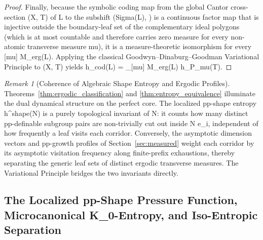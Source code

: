 \documentclass[11pt,a4paper,reqno]{amsart}
\def\({}%
\def\){}%
\def\mathcal#1{#1}%
\def\mathbb#1{#1}%
\def\mathrm#1{#1}%
\def\mu{mu}%
\def\Sigma{Sigma}%
\theoremstyle{definition}
\theoremstyle{remark}
\newtheorem{remark}[theorem]{Remark}
\begin{document}
\begin{proof}
Finally, because the symbolic coding map from the global Cantor cross-section \((X, T)\) of \(\mathcal{L}\) to the subshift \((\Sigma(\mathcal{L}), \sigma)\) is a continuous factor map that is injective outside the boundary-leaf set of the complementary ideal polygons (which is at most countable and therefore carries zero measure for every non-atomic transverse measure \(\mu\)), it is a measure-theoretic isomorphism for every \([\mu] \in \mathcal{M}_{\mathrm{erg}}(\mathcal{L})\). Applying the classical Goodwyn--Dinaburg--Goodman Variational Principle \cite[Theorem~8.6]{Walters1982} to \((X, T)\) yields \(h_{\mathrm{cod}}(\mathcal{L}) = \sup_{[\mu] \in \mathcal{M}_{\mathrm{erg}}(\mathcal{L})} h_{\mathbb{P}_\mu}(T)\).
\end{proof}

\begin{remark}[Coherence of Algebraic Shape Entropy and Ergodic Profiles]
\label{rem:sec11_sec12_coherence}
Theorems~\ref{thm:ergodic_classification} and \ref{thm:entropy_equivalence} illuminate the dual dynamical structure on the perfect core. The localized pp-shape entropy \(h^{\mathrm{shape}}(N)\) is a purely topological invariant of \(N\): it counts how many distinct pp-definable subgroup pairs are non-trivially cut out inside \(N e_i\), independent of how frequently a leaf visits each corridor. Conversely, the asymptotic dimension vectors and pp-growth profiles of Section~\ref{sec:measured} weight each corridor by its asymptotic visitation frequency along finite-prefix exhaustions, thereby separating the generic leaf sets of distinct ergodic transverse measures. The Variational Principle bridges the two invariants directly.
\end{remark}


\subsection{The Localized pp-Shape Pressure Function, Microcanonical \texorpdfstring{\(K_0\)}{K0}-Entropy, and Iso-Entropic Separation}
\label{subsec:pp_pressure}
\end{document}
